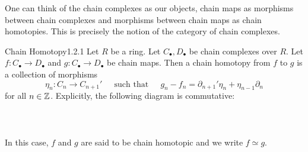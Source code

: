 \documentclass[a4paper]{article}
\begin{document}
One can think of the chain complexes as our objects, chain maps as morphisms between chain complexes and morphisms between chain maps as chain homotopies. This is precisely the notion of the category of chain complexes. 

\begin{defn}{Chain Homotopy}{1.2.1} Let $R$ be a ring. Let $C_\bullet,D_\bullet$ be chain complexes over $R$. Let $f:C_\bullet\to D_\bullet$ and $g:C_\bullet\to D_\bullet$ be chain maps. Then a chain homotopy from $f$ to $g$ is a collection of morphisms $$\eta_n:C_n\to C_{n+1}'\;\;\;\;\text{ such that }\;\;\;\;g_n-f_n=\partial_{n+1}'\eta_n+\eta_{n-1}\partial_n$$ for all $n\in\mathbb{Z}$. Explicitly, the following diagram is commutative: \\~\\
\\~\\
In this case, $f$ and $g$ are said to be chain homotopic and we write $f\simeq g$. 
\end{defn}
\end{document}
